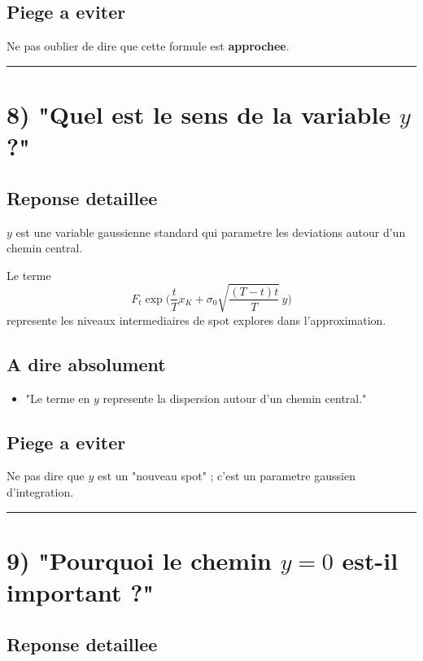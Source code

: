 \documentclass[11pt,a4paper]{article}
\begin{document}
\subsection{Piege a eviter}

Ne pas oublier de dire que cette formule est \textbf{approchee}.

\bigskip\hrule\bigskip

\section{8) "Quel est le sens de la variable \(y\) ?"}

\subsection{Reponse detaillee}

\(y\) est une variable gaussienne standard qui parametre les deviations autour d'un chemin central.

Le terme
\[
F_t\exp\!\Big(
\frac{t}{T}x_K+\sigma_0\sqrt{\frac{(T-t)t}{T}}\,y
\Big)
\]
represente les niveaux intermediaires de spot explores dans l'approximation.

\subsection{A dire absolument}

\begin{itemize}
\item "Le terme en \(y\) represente la dispersion autour d'un chemin central."
\end{itemize}

\subsection{Piege a eviter}

Ne pas dire que \(y\) est un "nouveau spot" ; c'est un parametre gaussien d'integration.

\bigskip\hrule\bigskip

\section{9) "Pourquoi le chemin \(y=0\) est-il important ?"}

\subsection{Reponse detaillee}
\end{document}
